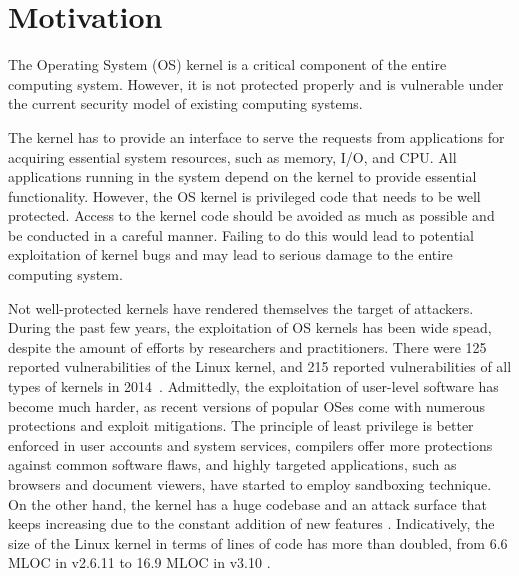 \section{Motivation}
\label{sec.motivation}

The Operating System (OS) kernel is a critical component of the entire computing system. 
However, it is not protected properly and is vulnerable under the current security model of existing 
computing systems.

The kernel has to provide an interface to serve the requests from applications for acquiring 
essential system resources, such as memory, I/O, and CPU. 
All applications running in the system depend on the kernel to provide 
essential functionality.   
%
However, the OS kernel is privileged code that needs to be well protected. Access to the
kernel code should be avoided as much as possible and be conducted in a careful manner. 
Failing to do this would lead to potential exploitation of kernel bugs and 
may lead to serious damage to the entire computing system.  

Not well-protected kernels have rendered themselves the target of attackers. During the past few years, 
the exploitation of OS kernels has been wide spead, 
despite the amount of efforts by researchers and practitioners. 
There were 125 reported vulnerabilities of the Linux kernel, and 215 reported vulnerabilities 
of all types of kernels in 2014~\cite{NVD:14}. Admittedly, the exploitation of user-level software 
has become much harder, as recent versions of popular OSes come with numerous protections 
and exploit mitigations. The principle of least privilege is better enforced in user accounts 
and system services, compilers offer more protections against common software flaws, 
and highly targeted applications, such as browsers and document viewers, have started to 
employ sandboxing technique. 
On the other hand, the kernel has a huge codebase and 
an attack surface that keeps increasing due to the constant addition of 
new features \cite{Metrics:13}. Indicatively, the size of the Linux kernel in terms of lines of code 
has more than doubled, from 6.6 MLOC in v2.6.11 to 16.9 MLOC in v3.10 \cite{Linux:13}.

